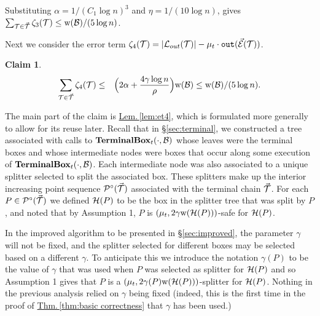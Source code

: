 \documentclass{acmsmall}
\newtheorem{claim}[theorem]{Claim}
\newcommand{\cB}{{\cal B}}
\newcommand{\cE}{{\cal E}}
\newcommand{\cH}{{\cal H}}
\newcommand{\cL}{{\cal L}}
\newcommand{\cP}{{\cal P}}
\newcommand{\cT}{{\cal T}}
\newcommand{\Sec}[1]{\hyperref[sec:#1]{\S\ref*{sec:#1}}} %
\newcommand{\Thm}[1]{\hyperref[thm:#1]{Thm.\,\ref*{thm:#1}}} %
\newcommand{\Lem}[1]{\hyperref[lem:#1]{Lem.\,\ref*{lem:#1}}} %
\newcommand{\outside}{{\tt out}}
\newcommand{\terminalbox}{{\rm{\bf TerminalBox}}}
\newcommand{\taint}{\eta}
\newcommand{\width}{{\bf {\rm  w}}}
\newcommand{\gridprec}{\alpha}
\newcommand{\errorterm}{\zeta}
\begin{document}
Substituting  $\gridprec = 1/(C_1\log n)^3$ and $\taint = 1/(10\log n)$,
gives $\sum_{\cT \in \vec{\cT}} \errorterm_3(\cT) \leq \width(\cB)/(5\log n)$.


Next we consider the error term $\errorterm_4(\cT) = |\cL_{out}(\cT)| - \mu_t\cdot\outside(\vec{\cE}(\cT))$.  

\begin{claim}
\label{clm:et4}
\begin{eqnarray*}
\sum_{\cT \in \vec{\cT}} \errorterm_4 (\cT)& \leq & \Big(2\gridprec+\frac{4\gamma \log n}{\rho}\Big) \width(\cB) \leq \width(\cB)/(5\log n).
\end{eqnarray*}
\end{claim}

The main part of the claim is \Lem{et4}, which is formulated more generally to allow for its reuse later.  
Recall that in \Sec{terminal}, we constructed a tree associated with calls to $\terminalbox_t(\cdot,\cB)$
whose leaves were the terminal boxes and whose intermediate nodes were boxes that occur along some execution of $\terminalbox_t(\cdot,\cB)$.
Each intermediate node was also associated to a unique splitter selected to split the associated box.   
These splitters make up the interior increasing point sequence $\cP^{\circ}(\vec{\cT})$ associated with the terminal
chain $\vec{\cT}$.  For each $P \in \cP^{\circ}(\vec{\cT})$ we defined
$\cH(P)$ to be the box in the splitter tree that was split by $P$, and noted that by Assumption 1,
$P$ is $(\mu_t,2\gamma \width(\cH(P)))$-safe for $\cH(P)$.  

In the improved algorithm to be presented in \Sec{improved}, the parameter $\gamma$ will not be fixed, and the splitter selected for different boxes may
be selected based on a different $\gamma$.  To anticipate this we introduce the notation $\gamma(P)$ to be the value of $\gamma$ that was used
when $P$ was selected as splitter for $\cH(P)$ and so Assumption 1 gives that $P$ is a $(\mu_t,2\gamma(P) \width(\cH(P)))$-splitter for $\cH(P)$.
Nothing in the previous analysis relied on $\gamma$ being fixed (indeed, this is the first time in the proof of \Thm{basic correctness}  that $\gamma$ has been 
used.)
%
\end{document}
